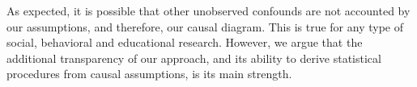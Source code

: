 \begin{comment}
Age Knowledge changes as individual get older. We expect to observe an increase with age,
840 with individual diﬀerences that can emerge as a result of several factors. Age has a direct eﬀect
841 on knowledge, as it stands for increasing cognitive abilities of human brains that allow to store and
842 manage information (Age → Knowledge). But also, and maybe more importantly, the total eﬀect
843 of Age include paths passing through the other factors: as individuals get older, other traits change,
844 which have an eﬀect on knowledge. As individuals age, the time they spend performing speciﬁc
845 activities varies (Age → Activities), they start or stop going to school (Age → Schooling), or their
846 family situation changes (e.g. new siblings are born, Age → Family).
847 Sex We do not expect a direct eﬀect of sex of individuals on knowledge. Rather, we think of
848 gender diﬀerences as inﬂuencing both the probability at which activities are performed, some tasks
849 being typically done by girls and other by boys, as well as, potentially, school attendance (Sex →
850 Activities and Sex → Schooling).
\end{comment}


As expected, it is possible that other unobserved confounds are not accounted by our assumptions, and therefore, our causal diagram. This is true for any type of social, behavioral and educational research. However, we argue that the additional transparency of our approach,
and its ability to derive statistical procedures from causal assumptions, is its main strength.

